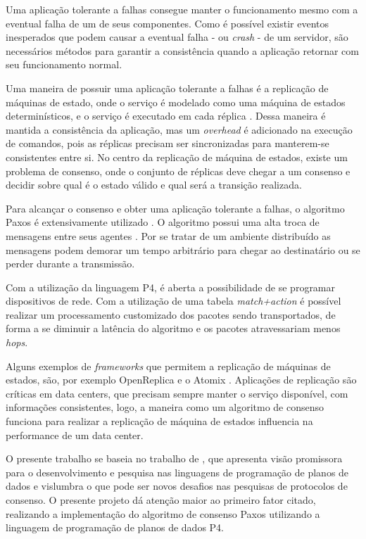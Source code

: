 \documentclass[
    12pt,
    openright, 
    oneside,
    a4paper,
    french,
    english,
    brazil
    ]{facom-ufu-abntex2}
\theoremstyle{definition}
\begin{document}
Uma aplicação tolerante a falhas consegue manter o funcionamento mesmo com a eventual 
falha de um de seus componentes. 
Como é possível existir eventos inesperados que podem causar a eventual falha - ou \emph{crash} - de um servidor, 
são necessários métodos para garantir a consistência quando a aplicação retornar com seu funcionamento normal. 

Uma maneira de possuir uma aplicação tolerante a falhas é a replicação de máquinas de estado, onde o serviço é modelado 
como uma máquina de estados determinísticos, e o serviço é executado em cada réplica \cite{santos2012state}. Dessa maneira 
é mantida a consistência da aplicação, mas um \emph{overhead} é adicionado na execução de comandos, pois as réplicas precisam 
ser sincronizadas para manterem-se consistentes entre si. No centro da replicação de máquina de estados, existe um problema 
de consenso, onde o conjunto de réplicas deve chegar a um consenso e decidir sobre qual é o estado válido e qual será
a transição realizada. 

Para alcançar o consenso e obter uma aplicação tolerante a falhas, o algoritmo Paxos é extensivamente utilizado \cite{dang2016paxos}. 
O algoritmo possui uma alta troca de mensagens entre seus agentes \cite{netchainRtt}. Por se tratar de um ambiente distribuído as 
mensagens podem demorar um tempo arbitrário para chegar ao destinatário ou se perder durante a transmissão.

Com a utilização da linguagem P4, é aberta a possibilidade de se programar dispositivos de rede. 
Com a utilização de uma tabela \emph{match+action} é possível realizar um processamento customizado dos pacotes sendo transportados, de 
forma a se diminuir a latência do algoritmo e os pacotes atravessariam menos \emph{hops}.

Alguns exemplos de \emph{frameworks} que permitem a replicação de máquinas de estados, são, por exemplo OpenReplica \cite{openreplica} 
e o Atomix \cite{atomixio}. 
Aplicações de replicação são críticas em data centers, que precisam sempre manter o serviço  disponível, com informações consistentes,
logo, a maneira como um algoritmo de consenso funciona para realizar a replicação de máquina de estados influencia na 
performance de um data center.

O presente trabalho se baseia no trabalho de \cite{dang2016paxos}, que apresenta visão
promissora para o desenvolvimento e pesquisa nas linguagens de programação de planos de dados 
e vislumbra o que pode ser novos desafios nas pesquisas de protocolos de consenso.
O presente projeto dá atenção maior ao primeiro fator citado, realizando a implementação do algoritmo de consenso Paxos utilizando 
a linguagem de programação de planos de dados P4. 
\end{document}
